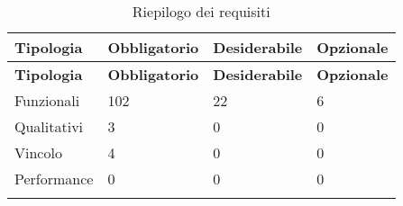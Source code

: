 \def\arraystretch{1.5}
\begin{longtable}{p{2.5cm}!{\VRule[1pt]}p{2.5cm}!{\VRule[1pt]}p{2.5cm}!{\VRule[1pt]}p{2.5cm}}
\color{white} \textbf{Tipologia} & \color{white} \textbf{Obbligatorio} & \color{white} \textbf{Desiderabile} & \color{white} \textbf{Opzionale} \\ 
\endfirsthead 
{} 
\color{white} \textbf{Tipologia} & \color{white} \textbf{Obbligatorio} & \color{white} \textbf{Desiderabile} & \color{white} \textbf{Opzionale} \\ 
\endhead 
Funzionali & 102 & 22 & 6\\Qualitativi & 3 & 0 & 0\\Vincolo & 4 & 0 & 0\\Performance & 0 & 0 & 0\\
\caption{Riepilogo dei requisiti}
\end{longtable}